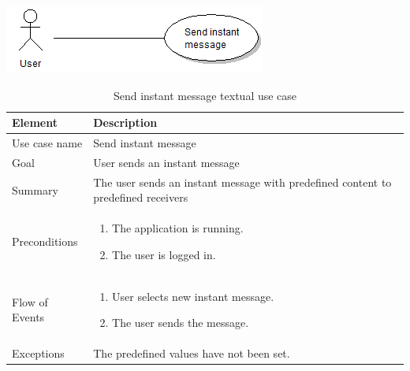 \begin{table}
\begin{center}
\begin{center}
\includegraphics[width=\textwidth]{send_instant_message}
\end{center}
\begin{tabular}{p{3cm}|p{12cm}} \hline
\textbf{Element} & \textbf{Description} \\ \hline \hline
Use case name & Send instant message \\
Goal & User sends an instant message \\
Summary & The user sends an instant message with predefined content to predefined receivers \\
Preconditions &
\begin{enumerate}
\item{}The application is running.
\item{}The user is logged in.
\end{enumerate} \\ \hline
Flow of Events &
\begin{enumerate}
\item{}User selects new instant message.
\item{}The user sends the message.
\end{enumerate} \\ \hline
Exceptions & The predefined values have not been set.\\ \hline
\end{tabular}
\end{center}
\caption{Send instant message textual use case} \label{tab:createmessage}
\end{table}

